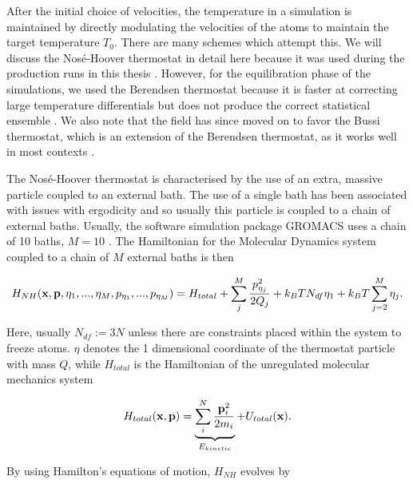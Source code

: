 After the initial choice of velocities, the temperature in a simulation is maintained by directly modulating the velocities of the atoms to maintain the target temperature $T_0$. There are many schemes which attempt this. We will discuss the Nos\'e-Hoover thermostat in detail here because it was used during the production runs in this thesis  \cite{nose1984}\cite{hoover1985}\cite{martyna1992}. However, for the equilibration phase of the simulations, we used the Berendsen thermostat because it is faster at correcting large temperature differentials but does not produce the correct statistical ensemble \cite{bussi2007}\cite{berendsen1984a}. We also note that the field has since moved on to favor the Bussi thermostat, which is an extension of the Berendsen thermostat, as it works well in most contexts  \cite{bussi2007}\cite{braun2019}.

The Nos\'e-Hoover thermostat is characterised by the use of an extra, massive particle coupled to an external bath. The use of a single bath has been associated with issues with ergodicity and so usually this particle is coupled to a chain of external baths. Usually, the software simulation package GROMACS uses a chain of 10 baths, $M=10$ \cite{martyna1992}\cite{martyna1996}\cite{abraham2015}. The Hamiltonian for the Molecular Dynamics system coupled to a chain of $M$ external baths is then

\begin{equation}
	H_{NH} (\bold{x},\bold{p},\eta_1 , ... , \eta_M, p_{\eta_1}, ...,  p_{\eta_M}  )= H_{total} + \sum_j^M \frac{p^2_{\eta_j}}{2Q_j} +k_BT  N_{df}   \eta_1   + k_BT \sum_{j=2}^M\eta_j.
\end{equation}

Here, usually $N_{df} := 3N$ unless there are constraints placed within the system to freeze atoms. $\eta$ denotes the 1 dimensional coordinate of the thermostat particle with mass $Q$, while $H_{total}$ is the Hamiltonian of the unregulated molecular mechanics system 

\begin{equation}
H_{total}(\bold{x},\bold{p}) = \underbrace{\sum_i^N \frac{\bold{p}_i^2}{2 m_i}}_{E_{kinetic}} + U_{total} (\bold{x}). 
\end{equation}

By using Hamilton's equations of motion, $H_{NH}$ evolves by

